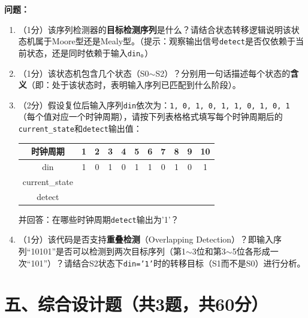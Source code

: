 \begin{framed}
\textbf{问题：}
\begin{enumerate}[label=(\arabic*)]
  \item （1分）该序列检测器的\textbf{目标检测序列}是什么？请结合状态转移逻辑说明该状态机属于Moore型还是Mealy型。（提示：观察输出信号\texttt{detect}是否仅依赖于当前状态，还是同时依赖于输入\texttt{din}。）

  \item （1分）该状态机包含几个状态（S0$\sim$S2）？分别用一句话描述每个状态的\textbf{含义}（即：处于该状态时，表明输入序列已匹配到什么阶段）。

  \item （2分）假设复位后输入序列\texttt{din}依次为：\texttt{1, 0, 1, 0, 1, 1, 0, 1, 0, 1}（每个值对应一个时钟周期），请按下列表格格式填写每个时钟周期后的\texttt{current\_state}和\texttt{detect}输出值：

  \vspace{0.2cm}
  {\centering
  \begin{tabular}{|c|c|c|c|c|c|c|c|c|c|c|}
  \hline
  时钟周期 & 1 & 2 & 3 & 4 & 5 & 6 & 7 & 8 & 9 & 10 \\
  \hline
  din & 1 & 0 & 1 & 0 & 1 & 1 & 0 & 1 & 0 & 1 \\
  \hline
  current\_state & & & & & & & & & & \\
  \hline
  detect & & & & & & & & & & \\
  \hline
  \end{tabular}
  \par}

  \vspace{0.2cm}
  并回答：在哪些时钟周期\texttt{detect}输出为'1'？

  \item （1分）该代码是否支持\textbf{重叠检测}（Overlapping Detection）？即输入序列``10101''是否可以检测到两次目标序列（第1$\sim$3位和第3$\sim$5位各形成一次“101”）？请结合S2状态下\texttt{din='1'}时的转移目标（S1而不是S0）进行分析。
\end{enumerate}
\end{framed}

\newpage

\section*{五、综合设计题（共3题，共60分）}

